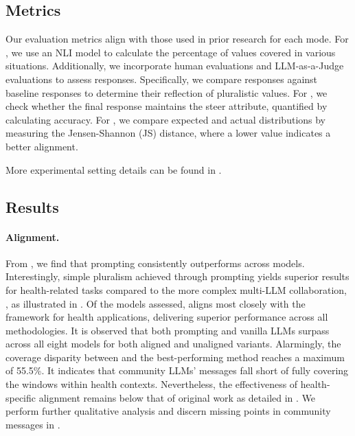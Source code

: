 \subsection{Metrics}
Our evaluation metrics align with those used in prior research \cite{positionpluralistic,feng2024modular} for each mode. For {\overton}, we use an NLI model \citep{schuster2021get} to calculate the percentage of values covered in various situations. Additionally, we incorporate human evaluations and LLM-as-a-Judge evaluations to assess responses. Specifically, we compare \modplural responses against baseline responses to determine their reflection of pluralistic values. For \steerable, we check whether the final response maintains the steer attribute, quantified by calculating accuracy. For \distributional, we compare expected and actual distributions by measuring the Jensen-Shannon (JS) distance, where a lower value indicates a better alignment.

More experimental setting details can be found in .

\subsection{Results}
\label{sec:results}


\paragraph{\overton Alignment.}







From , we find that prompting consistently outperforms \modplural across models. Interestingly, simple pluralism achieved through prompting yields superior results for health-related tasks compared to the more complex multi-LLM collaboration, \modplural, as illustrated in . Of the models assessed, \gemmaSeven aligns most closely with the \overton framework for health applications, delivering superior performance across all methodologies. It is observed that both prompting and vanilla LLMs surpass \modplural across all eight models for both aligned and unaligned variants. Alarmingly, the coverage disparity between \modplural and the best-performing method reaches a maximum of 55.5\%. It indicates that community LLMs' messages fall short of fully covering the \overton windows within health contexts. Nevertheless, the effectiveness of health-specific \overton alignment remains below that of original \modplural work as detailed in \citet{feng2024modular}. We perform further qualitative analysis and discern missing points in community messages in .

